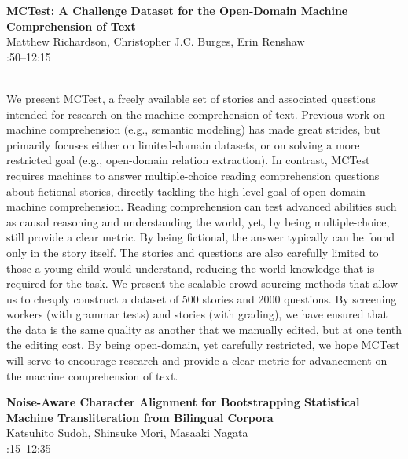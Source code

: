 \documentclass[twoside,makeidx]{book}
\renewcommand{\normalsize}{\fontsize{8}{9}\selectfont}
\renewcommand{\small}{\fontsize{7}{8}\selectfont}
\begin{document}
\par\vspace{2em}\noindent%
\begin{minipage}{\linewidth}%
\begin{center}
\textbf{\normalsize MCTest: A Challenge Dataset for the Open-Domain Machine Comprehension of Text}\\
\normalsize  Matthew Richardson,  Christopher J.C. Burges,  Erin Renshaw\\
{\small 11:50--12:15}\\
\end{center}
\end{minipage}\\[0.5em]
\nopagebreak%
\noindent%
{\small We present MCTest, a freely available set of stories and associated questions intended for research on the machine comprehension of text. Previous work on machine comprehension (e.g., semantic modeling) has made great strides, but primarily focuses either on limited-domain datasets, or on solving a more restricted goal (e.g., open-domain relation extraction). In contrast, MCTest requires machines to answer multiple-choice reading comprehension questions about fictional stories, directly tackling the high-level goal of open-domain machine comprehension. Reading comprehension can test advanced abilities such as causal reasoning and understanding the world, yet, by being multiple-choice, still provide a clear metric. By being fictional, the answer typically can be found only in the story itself. The stories and questions are also carefully limited to those a young child would understand, reducing the world knowledge that is required for the task. We present the scalable crowd-sourcing methods that allow us to cheaply construct a dataset of 500 stories and 2000 questions. By screening workers (with grammar tests) and stories (with grading), we have ensured that the data is the same quality as another that we manually edited, but at one tenth the editing cost. By being open-domain, yet carefully restricted, we hope MCTest will serve to encourage research and provide a clear metric for advancement on the machine comprehension of text.}
\par\vspace{2em}\noindent%
\begin{minipage}{\linewidth}%
\begin{center}
\textbf{\normalsize Noise-Aware Character Alignment for Bootstrapping Statistical Machine Transliteration from Bilingual Corpora}\\
\normalsize  Katsuhito Sudoh,  Shinsuke Mori,  Masaaki Nagata\\
{\small 12:15--12:35}\\
\end{center}
\end{minipage}\\[0.5em]
\end{document}
